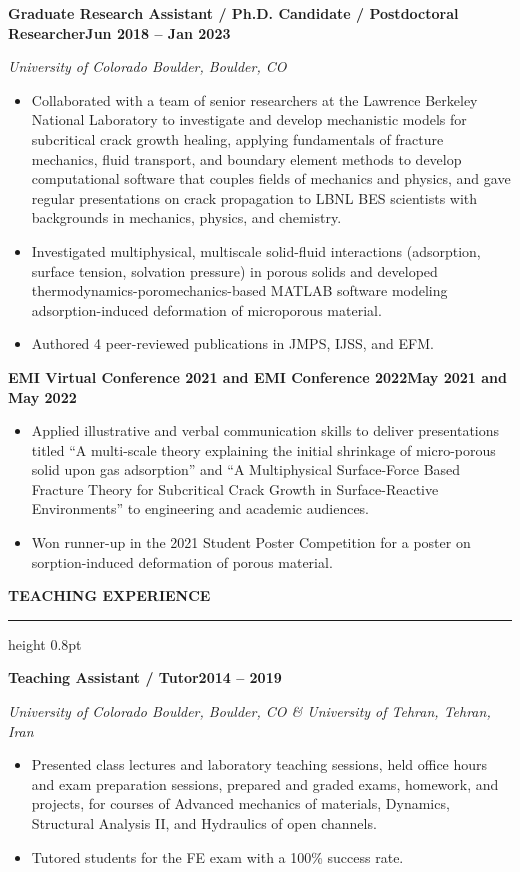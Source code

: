 \documentclass[10pt, letterpaper]{article}
\newcommand{\rsection}[1]{%
  \vspace{8pt}%
  {\large\bfseries\MakeUppercase{#1}}%
  \vspace{1pt}%
  \hrule height 0.8pt%
  \vspace{4pt}%
}
\newcommand{\jobline}[2]{%
  \vspace{5pt}%
  \noindent\textbf{#1}\hfill\textbf{#2}\par%
  \vspace{1pt}%
}
\newcommand{\subline}[1]{%
  \vspace{-1pt}%
  \noindent\textit{#1}\par%
  \vspace{1pt}%
}
\newenvironment{rlist}{%
  \begin{itemize}[leftmargin=1.4em, itemsep=1pt, topsep=2pt, parsep=0pt]%
}{%
  \end{itemize}%
}
\begin{document}
\jobline{Graduate Research Assistant / Ph.D. Candidate / Postdoctoral Researcher}{Jun 2018 -- Jan 2023}
\subline{University of Colorado Boulder, Boulder, CO}
\begin{rlist}
  \item Collaborated with a team of senior researchers at the Lawrence Berkeley National Laboratory to investigate and develop mechanistic models for subcritical crack growth healing, applying fundamentals of fracture mechanics, fluid transport, and boundary element methods to develop computational software that couples fields of mechanics and physics, and gave regular presentations on crack propagation to LBNL BES scientists with backgrounds in mechanics, physics, and chemistry.
  \item Investigated multiphysical, multiscale solid-fluid interactions (adsorption, surface tension, solvation pressure) in porous solids and developed thermodynamics-poromechanics-based MATLAB software modeling adsorption-induced deformation of microporous material.
  \item Authored 4 peer-reviewed publications in JMPS, IJSS, and EFM.
\end{rlist}

\jobline{EMI Virtual Conference 2021 and EMI Conference 2022}{May 2021 and May 2022}
\begin{rlist}
  \item Applied illustrative and verbal communication skills to deliver presentations titled ``A multi-scale theory explaining the initial shrinkage of micro-porous solid upon gas adsorption'' and ``A Multiphysical Surface-Force Based Fracture Theory for Subcritical Crack Growth in Surface-Reactive Environments'' to engineering and academic audiences.
  \item Won runner-up in the 2021 Student Poster Competition for a poster on sorption-induced deformation of porous material.
\end{rlist}


\rsection{Teaching Experience}

\jobline{Teaching Assistant / Tutor}{2014 -- 2019}
\subline{University of Colorado Boulder, Boulder, CO \& University of Tehran, Tehran, Iran}
\begin{rlist}
  \item Presented class lectures and laboratory teaching sessions, held office hours and exam preparation sessions, prepared and graded exams, homework, and projects, for courses of Advanced mechanics of materials, Dynamics, Structural Analysis II, and Hydraulics of open channels.
  \item Tutored students for the FE exam with a 100\% success rate.
\end{rlist}
\end{document}
